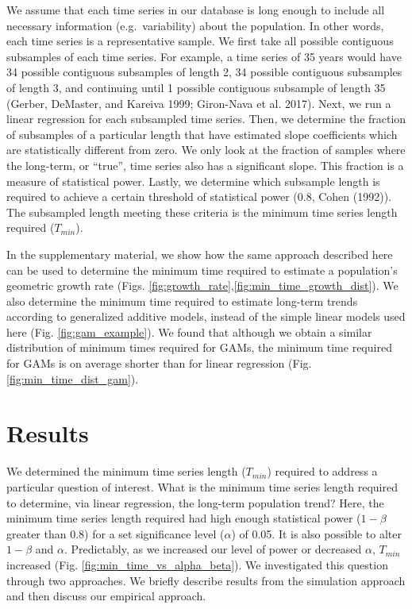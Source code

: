 \documentclass[12pt,]{article}
\begin{document}
We assume that each time series in our database is long enough to
include all necessary information (e.g.~variability) about the
population. In other words, each time series is a representative sample.
We first take all possible contiguous subsamples of each time series.
For example, a time series of 35 years would have 34 possible contiguous
subsamples of length 2, 34 possible contiguous subsamples of length 3,
and continuing until 1 possible contiguous subsample of length 35
(Gerber, DeMaster, and Kareiva 1999; Giron-Nava et al. 2017). Next, we
run a linear regression for each subsampled time series. Then, we
determine the fraction of subsamples of a particular length that have
estimated slope coefficients which are statistically different from
zero. We only look at the fraction of samples where the long-term, or
``true'', time series also has a significant slope. This fraction is a
measure of statistical power. Lastly, we determine which subsample
length is required to achieve a certain threshold of statistical power
(0.8, Cohen (1992)). The subsampled length meeting these criteria is the
minimum time series length required (\(T_{min}\)).

In the supplementary material, we show how the same approach described
here can be used to determine the minimum time required to estimate a
population's geometric growth rate (Figs.
\ref{fig:growth_rate},\ref{fig:min_time_growth_dist}). We also determine
the minimum time required to estimate long-term trends according to
generalized additive models, instead of the simple linear models used
here (Fig. \ref{fig:gam_example}). We found that although we obtain a
similar distribution of minimum times required for GAMs, the minimum
time required for GAMs is on average shorter than for linear regression
(Fig. \ref{fig:min_time_dist_gam}).

\section{Results}\label{results}

We determined the minimum time series length (\(T_{min}\)) required to
address a particular question of interest. What is the minimum time
series length required to determine, via linear regression, the
long-term population trend? Here, the minimum time series length
required had high enough statistical power (\(1-\beta\) greater than
0.8) for a set significance level (\(\alpha\)) of 0.05. It is also
possible to alter \(1-\beta\) and \(\alpha\). Predictably, as we
increased our level of power or decreased \(\alpha\), \(T_{min}\)
increased (Fig. \ref{fig:min_time_vs_alpha_beta}). We investigated this
question through two approaches. We briefly describe results from the
simulation approach and then discuss our empirical approach.
\end{document}
